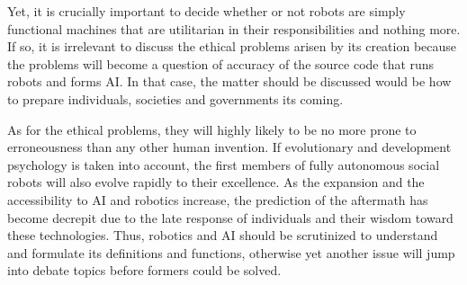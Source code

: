 \documentclass[man]{apa6}
\begin{document}
 
Yet, it is crucially important to decide whether or not robots are simply functional machines that are utilitarian in their responsibilities and nothing more.
If so, it is irrelevant to discuss the ethical problems arisen by its creation because the problems will become a question of accuracy of the source code that runs robots and forms AI.
In that case, the matter should be discussed would be how to prepare individuals, societies and governments its coming. \par
As for the ethical problems, they will highly likely to be no more prone to erroneousness than any other human invention.
If evolutionary and development psychology is taken into account, the first members of fully autonomous social robots will also evolve rapidly to their excellence.
As the expansion and the accessibility to AI and robotics increase, the prediction of the aftermath has become decrepit due to the late response of individuals and their wisdom toward these technologies.
Thus, robotics and AI should be scrutinized to understand and formulate its definitions and functions, otherwise yet another issue will jump into debate topics before formers could be solved.


\end{document}
